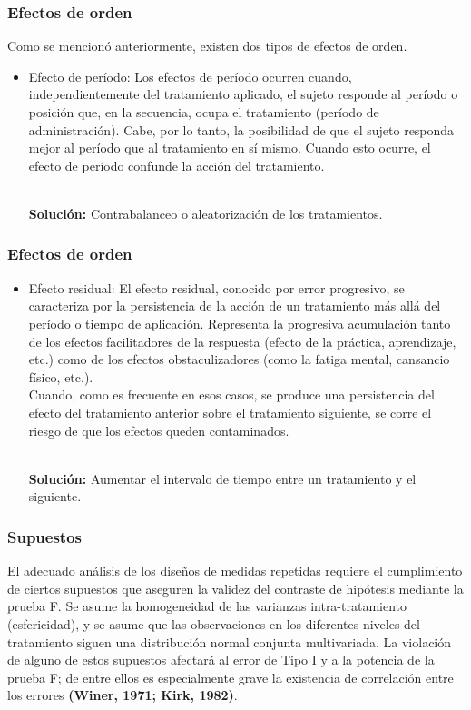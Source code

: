 \documentclass[12pt]{beamer}
\begin{document}
\begin{frame}
\frametitle{Efectos de orden}
Como se mencionó anteriormente, existen dos tipos de efectos de orden.
\begin{itemize}
\justifying
\item Efecto de período: Los efectos de período ocurren cuando, independientemente del tratamiento aplicado, el sujeto responde al período o posición que, en la secuencia, ocupa el tratamiento (período de administración). Cabe, por lo tanto, la posibilidad de que el sujeto responda mejor al período que al tratamiento en sí mismo. Cuando esto ocurre, el efecto de período confunde la acción del tratamiento.

~\\\textbf{Solución:} Contrabalanceo o aleatorización de los tratamientos.
\end{itemize}
\end{frame}

\begin{frame}
\frametitle{Efectos de orden}
\begin{itemize}
\justifying
\item Efecto residual: El efecto residual, conocido por error progresivo, se caracteriza por la persistencia de la acción de un tratamiento más allá del período o tiempo de aplicación. Representa la progresiva acumulación tanto de los efectos facilitadores de la respuesta (efecto de la práctica, aprendizaje, etc.) como de los efectos obstaculizadores (como la fatiga mental, cansancio físico, etc.).
~\\Cuando, como es frecuente en esos casos, se produce una persistencia del efecto del tratamiento anterior sobre el tratamiento siguiente, se corre el riesgo de que los efectos queden contaminados.

~\\\textbf{Solución:} Aumentar el intervalo de tiempo entre un tratamiento y el siguiente.                                  
\end{itemize}
\end{frame}

\begin{frame}
\frametitle{Supuestos}
El adecuado análisis de los diseños de medidas repetidas requiere el cumplimiento de ciertos
supuestos que aseguren la validez del contraste de hipótesis mediante la prueba F. Se asume la
homogeneidad de las varianzas intra-tratamiento (esfericidad), y se asume que las observaciones
en los diferentes niveles del tratamiento siguen una distribución normal conjunta multivariada. La
violación de alguno de estos supuestos afectará al error de Tipo I y a la potencia de la prueba F; de
entre ellos es especialmente grave la existencia de correlación entre los errores \textbf{(Winer, 1971;
Kirk, 1982)}.
\end{frame}
\end{document}
